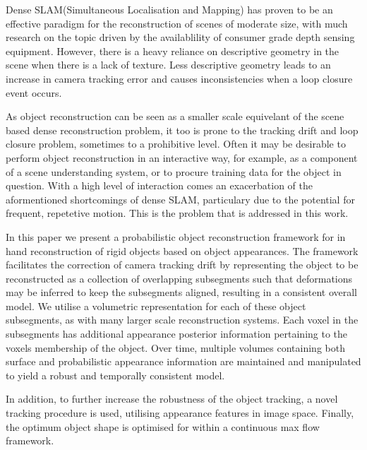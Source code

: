 Dense SLAM(Simultaneous Localisation and Mapping) has proven to be an effective paradigm for the reconstruction of scenes of moderate size,
with much research on the topic driven by the availablility of consumer grade depth sensing equipment. However, there is a heavy reliance on
descriptive geometry in the scene when there is a lack of texture. Less descriptive geometry leads to an increase in camera tracking error
and causes inconsistencies when a loop closure event occurs.

As object reconstruction can be seen as a smaller scale equivelant of the scene based dense reconstruction problem, it too is prone to the
tracking drift and loop closure problem, sometimes to a prohibitive level. Often it may be desirable to perform object reconstruction
in an interactive way, for example, as a component of a scene understanding system, or to procure training data for the object in question.
With a high level of interaction comes an exacerbation of the aformentioned shortcomings of dense SLAM, particulary due to the potential
for frequent, repetetive motion. This is the problem that is addressed in this work.

In this paper we present a probabilistic object reconstruction framework for in hand reconstruction of rigid objects based on object
appearances. The framework facilitates the correction of camera tracking drift by representing the object to be reconstructed as a
collection of overlapping subsegments such that deformations may be inferred to keep the subsegments aligned, resulting in a consistent
overall model. We utilise a volumetric representation for each of these object subsegments, as with many larger scale reconstruction
systems. Each voxel in the subsegments has additional appearance posterior information pertaining to the voxels membership of the object.
Over time, multiple volumes containing both surface and probabilistic appearance information are maintained and manipulated to yield a
robust and temporally consistent model.

In addition, to further increase the robustness of the object tracking, a novel tracking procedure is used, utilising appearance features
in image space. Finally, the optimum object shape is optimised for within a continuous max flow framework.